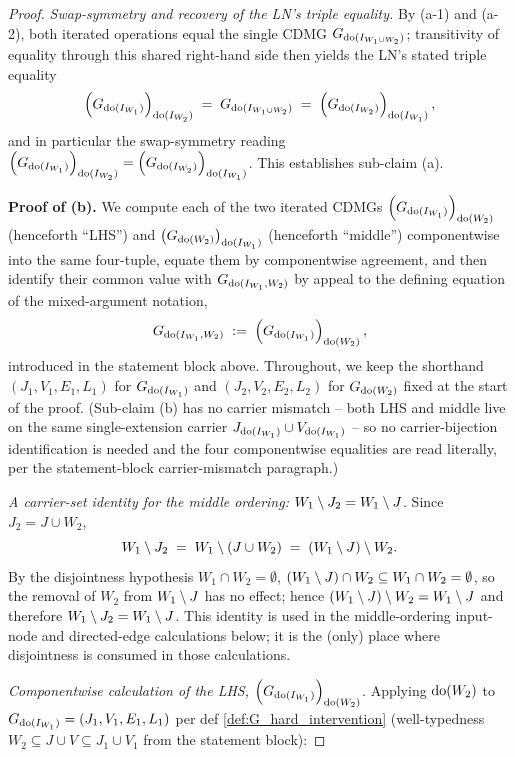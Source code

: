 \documentclass[main]{subfiles}
\begin{document}
\begin{proof}
\medskip\noindent\emph{Swap-symmetry and recovery of the LN's triple equality.}
By (a-1) and (a-2), both iterated operations equal the single CDMG $G_{\operatorname{do}(I_{W_1 \cup W_2})}$; transitivity of equality through this shared right-hand side then yields the LN's stated triple equality
\[
    \left ( G_{\operatorname{do}(I_{W_1})} \right )_{\operatorname{do}(I_{W_2})} \;=\; G_{\operatorname{do}(I_{W_1 \cup W_2})} \;=\; \left ( G_{\operatorname{do}(I_{W_2})} \right )_{\operatorname{do}(I_{W_1})},
\]
and in particular the swap-symmetry reading $\left ( G_{\operatorname{do}(I_{W_1})} \right )_{\operatorname{do}(I_{W_2})} = \left ( G_{\operatorname{do}(I_{W_2})} \right )_{\operatorname{do}(I_{W_1})}$. This establishes sub-claim (a).

\medskip\noindent\textbf{Proof of (b).}
We compute each of the two iterated CDMGs $\left ( G_{\operatorname{do}(I_{W_1})} \right )_{\operatorname{do}(W_2)}$ (henceforth ``LHS'') and $\left ( G_{\operatorname{do}(W_2)} \right )_{\operatorname{do}(I_{W_1})}$ (henceforth ``middle'') componentwise into the same four-tuple, equate them by componentwise agreement, and then identify their common value with $G_{\operatorname{do}(I_{W_1}, W_2)}$ by appeal to the defining equation of the mixed-argument notation,
\[
    G_{\operatorname{do}(I_{W_1}, W_2)} \;:=\; \left ( G_{\operatorname{do}(I_{W_1})} \right )_{\operatorname{do}(W_2)},
\]
introduced in the statement block above. Throughout, we keep the shorthand $(J_1, V_1, E_1, L_1)$ for $G_{\operatorname{do}(I_{W_1})}$ and $(J_2, V_2, E_2, L_2)$ for $G_{\operatorname{do}(W_2)}$ fixed at the start of the proof. (Sub-claim (b) has no carrier mismatch -- both LHS and middle live on the same single-extension carrier $J_{\operatorname{do}(I_{W_1})} \cup V_{\operatorname{do}(I_{W_1})}$ -- so no carrier-bijection identification is needed and the four componentwise equalities are read literally, per the statement-block carrier-mismatch paragraph.)

\smallskip\noindent\emph{A carrier-set identity for the middle ordering: $W_1 \setminus J_2 = W_1 \setminus J$.}
Since $J_2 = J \cup W_2$,
\[
    W_1 \setminus J_2 \;=\; W_1 \setminus (J \cup W_2) \;=\; (W_1 \setminus J) \setminus W_2.
\]
By the disjointness hypothesis $W_1 \cap W_2 = \emptyset$, $(W_1 \setminus J) \cap W_2 \subseteq W_1 \cap W_2 = \emptyset$, so the removal of $W_2$ from $W_1 \setminus J$ has no effect; hence $(W_1 \setminus J) \setminus W_2 = W_1 \setminus J$ and therefore $W_1 \setminus J_2 = W_1 \setminus J$. This identity is used in the middle-ordering input-node and directed-edge calculations below; it is the (only) place where disjointness is consumed in those calculations.

\smallskip\noindent\emph{Componentwise calculation of the LHS, $\left ( G_{\operatorname{do}(I_{W_1})} \right )_{\operatorname{do}(W_2)}$.}
Applying $\operatorname{do}(W_2)$ to $G_{\operatorname{do}(I_{W_1})} = (J_1, V_1, E_1, L_1)$ per def \ref{def:G_hard_intervention} (well-typedness $W_2 \subseteq J \cup V \subseteq J_1 \cup V_1$ from the statement block):


\end{proof}
\end{document}
